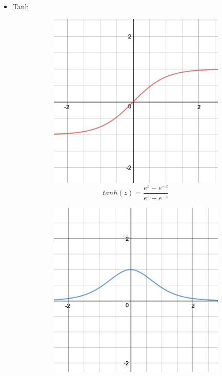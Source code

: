 \begin{itemize}
    \item Tanh
    \begin{figure}[H]
        \centering
        \begin{subfigure}{0.5\textwidth}
            \centering
            \includegraphics[width=0.9\linewidth]{fig/actfunc_tanh.png}
            \caption{%
                \begin{equation}
                    tanh(z) = \frac{e^{z} - e^{-z}}{e^{z} + e^{-z}}
                \end{equation}
            }
            \label{fig:actfunc_tanh}
        \end{subfigure}%
        \begin{subfigure}{0.5\textwidth}
            \centering
            \includegraphics[width=0.9\linewidth]{fig/actfunc_tanh_der.png}

\end{subfigure}
\end{figure}
\end{itemize}
